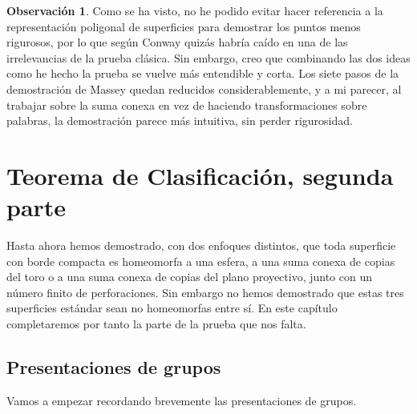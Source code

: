 \documentclass[10pt]{report}
\theoremstyle{definition}
\newtheorem{obs}[defin]{Observación}
\begin{document}
\begin{obs}
Como se ha visto, no he podido evitar hacer referencia a la representación poligonal de superficies para demostrar los puntos menos rigurosos, por lo que según Conway quizás habría caído en una de las irrelevancias de la prueba clásica. Sin embargo, creo que combinando las dos ideas como he hecho la prueba se vuelve más entendible y corta. Los siete pasos de la demostración de Massey quedan reducidos considerablemente, y a mi parecer, al trabajar sobre la suma conexa en vez de haciendo transformaciones sobre palabras, la demostración parece más intuitiva, sin perder rigurosidad.\\
\end{obs}

\chapter{Teorema de Clasificación, segunda parte}
Hasta ahora hemos demostrado, con dos enfoques distintos, que toda superficie con borde compacta es homeomorfa a una esfera, a una suma conexa de copias del toro o a una suma conexa de copias del plano proyectivo, junto con un número finito de perforaciones. Sin embargo no hemos demostrado que estas tres superficies estándar sean no homeomorfas entre sí. En este capítulo completaremos por tanto la parte de la prueba que nos falta. 

\section{Presentaciones de grupos}
Vamos a empezar recordando brevemente las presentaciones de grupos. 
\end{document}
